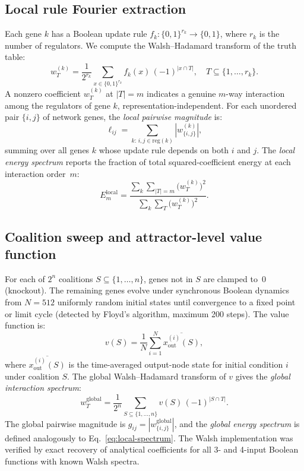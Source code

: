 \documentclass[10pt]{article}
\begin{document}
\subsection{Local rule Fourier extraction}
\label{sec:local-fourier}

Each gene $k$ has a Boolean update rule $f_k\colon \{0,1\}^{r_k}
\to \{0,1\}$, where $r_k$ is the number of regulators. We compute
the Walsh--Hadamard transform of the truth table:
%
\begin{equation}
\label{eq:local-wht}
w_T^{(k)} = \frac{1}{2^{r_k}} \sum_{x \in \{0,1\}^{r_k}} f_k(x)\,(-1)^{|x \cap T|},
\quad T \subseteq \{1, \ldots, r_k\}.
\end{equation}
%
A nonzero coefficient $w_T^{(k)}$ at $|T| = m$ indicates a genuine
$m$-way interaction among the regulators of gene $k$,
representation-independent. For each unordered pair $\{i,j\}$ of
network genes, the \emph{local pairwise magnitude} is:
%
\begin{equation}
\label{eq:local-pair}
\ell_{ij} = \sum_{k:\, i,j \in \mathrm{reg}(k)} |w_{\{i,j\}}^{(k)}|,
\end{equation}
%
summing over all genes $k$ whose update rule depends on both $i$ and
$j$. The \emph{local energy spectrum} reports the fraction of total
squared-coefficient energy at each interaction order~$m$:
%
\begin{equation}
\label{eq:local-spectrum}
E_m^{\mathrm{local}} = \frac{\sum_k \sum_{|T|=m} \bigl(w_T^{(k)}\bigr)^2}
{\sum_k \sum_T \bigl(w_T^{(k)}\bigr)^2}.
\end{equation}


\subsection{Coalition sweep and attractor-level value function}
\label{sec:coalition-sweep}

For each of $2^n$ coalitions $S \subseteq \{1,\ldots,n\}$, genes not
in $S$ are clamped to~0 (knockout). The remaining genes evolve under
synchronous Boolean dynamics from $N = 512$ uniformly random initial
states until convergence to a fixed point or limit cycle (detected by
Floyd's algorithm, maximum 200 steps). The value function is:
%
\begin{equation}
\label{eq:value}
v(S) = \frac{1}{N} \sum_{i=1}^{N}
\overline{x_{\mathrm{out}}^{(i)}(S)},
\end{equation}
%
where $\overline{x_{\mathrm{out}}^{(i)}(S)}$ is the time-averaged
output-node state for initial condition $i$ under coalition $S$. The
global Walsh--Hadamard transform of $v$ gives the \emph{global
interaction spectrum}:
%
\begin{equation}
\label{eq:global-wht}
w_T^{\mathrm{global}} = \frac{1}{2^n} \sum_{S \subseteq \{1,\ldots,n\}}
v(S)\,(-1)^{|S \cap T|}.
\end{equation}
%
The global pairwise magnitude is
$g_{ij} = |w_{\{i,j\}}^{\mathrm{global}}|$, and the
\emph{global energy spectrum} is defined analogously to
Eq.~\ref{eq:local-spectrum}. The Walsh implementation was verified
by exact recovery of analytical coefficients for all 3- and 4-input
Boolean functions with known Walsh spectra.
\end{document}

